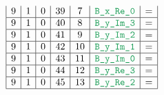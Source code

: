 \begin{figure}[h!]
\begin{adjustwidth}{-2cm}{-2cm}
{\[\begin{array}{|c|c|c|c|c|c|c|}
                    9                      & 1                                            & 0                                              & 39                     & 7                   & \locBXReZero         & =                                                                                                                                                                     \\ \hline
                    9                      & 1                                            & 0                                              & 40                     & 8                   & \locBYImThree        & =                                                                                                                                                                     \\ \hline
                    9                      & 1                                            & 0                                              & 41                     & 9                   & \locBYImTwo          & =                                                                                                                                                                     \\ \hline
                    9                      & 1                                            & 0                                              & 42                     & 10                  & \locBYImOne          & =                                                                                                                                                                     \\ \hline
                    9                      & 1                                            & 0                                              & 43                     & 11                  & \locBYImZero         & =                                                                                                                                                                     \\ \hline
                    9                      & 1                                            & 0                                              & 44                     & 12                  & \locBYReThree        & =                                                                                                                                                                     \\ \hline
                    9                      & 1                                            & 0                                              & 45                     & 13                  & \locBYReTwo          & =                                                                                                                                                                     \\ \hline

\end{array}\]}
\end{adjustwidth}
\end{figure}

